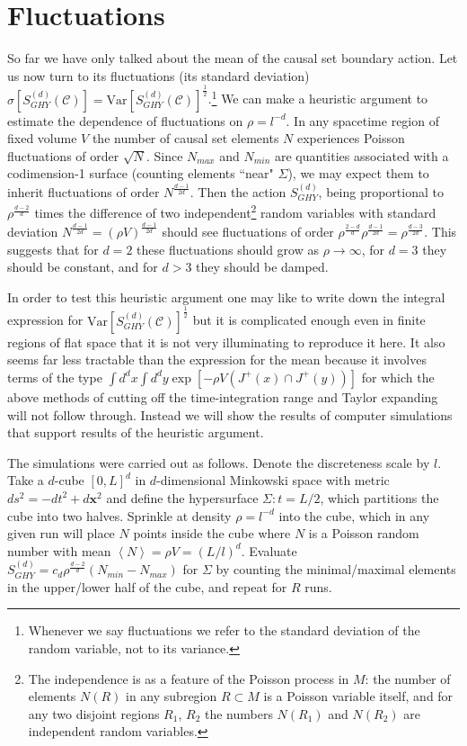 \documentclass[12pt]{article}
\begin{document}
\section{Fluctuations}
So far we have only talked about the mean of the causal set boundary action. Let us now turn to its fluctuations (its standard deviation) $\sigma[S^{(d)}_{GHY}(\mathcal C)]=\text{Var}[S^{(d)}_{GHY}(\mathcal C)]^\frac12$.\footnote{Whenever we say fluctuations we refer to the standard deviation of the random variable, not to its variance.} We can make a heuristic argument to estimate the dependence of fluctuations on $\rho=l^{-d}$. In any spacetime region of fixed volume $V$ the number of causal set elements $N$ experiences Poisson fluctuations of order $\sqrt N$. Since $N_{max}$ and $N_{min}$ are quantities associated with a codimension-1 surface (counting elements ``near" $\Sigma$), we may expect them to inherit fluctuations of order $N^\frac{d-1}{2d}$. Then the action $S^{(d)}_{GHY}$, being proportional to $\rho^\frac{d-2}{d}$ times the difference of two independent\footnote{The independence is as a feature of the Poisson process in $M$: the number of elements $N(R)$ in any subregion $R\subset M$ is a Poisson variable itself, and for any two disjoint regions $R_1$, $R_2$ the numbers $N(R_1)$ and $N(R_2)$ are independent random variables.} random variables with standard deviation $N^\frac{d-1}{2d} = (\rho V)^\frac{d-1}{2d}$ should see fluctuations of order $\rho^\frac{2-d}{d}\rho^\frac{d-1}{2d}=\rho^\frac{d-3}{2d}$. This suggests that for $d=2$ these fluctuations should grow as $\rho\rightarrow\infty$, for $d=3$ they should be constant, and for $d>3$ they should be damped.

In order to test this heuristic argument one may like to write down the integral expression for $\text{Var}[S^{(d)}_{GHY}(\mathcal C)]^\frac12$ but it is complicated enough even in finite regions of flat space that it is not very illuminating to reproduce it here. It also seems far less tractable than the expression for the mean because it involves terms of the type $\int d^dx\int d^dy \exp\left[-\rho V(J^+(x)\cap J^+(y))\right]$ for which the above methods of cutting off the time-integration range and Taylor expanding will not follow through. Instead we will show the results of computer simulations that support results of the heuristic argument. 
 
The simulations were carried out as follows. Denote the discreteness scale by $l$. Take a $d$-cube $[0,L]^d$ in $d$-dimensional Minkowski space with metric $ds^2=-dt^2+d{\mathbf x}^2$ and define the hypersurface $\Sigma: t=L/2$, which partitions the cube into two halves. Sprinkle at density $\rho=l^{-d}$ into the cube, which in any given run will place $N$ points inside the cube where $N$ is a Poisson random number with mean $\left\langle N\right\rangle = \rho V=  (L/l)^d$. Evaluate $S^{(d)}_{GHY}=c_d\rho^\frac{d-2}{d}(N_{min} - N_{max})$ for $\Sigma$ by counting the minimal/maximal elements in the upper/lower half of the cube, and repeat for $R$ runs.

\newpage




\end{document}
